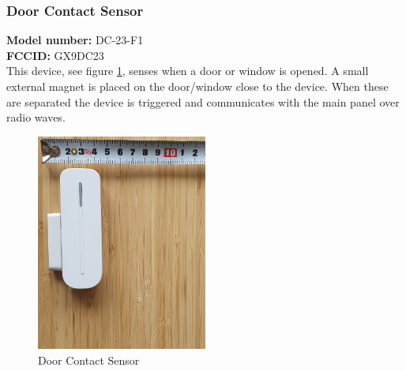 \subsubsection{Door Contact Sensor}
\textbf{Model number:} DC-23-F1 \\
\textbf{FCCID:} GX9DC23 \\
This device, see figure \ref{fig:door-contact}, senses when a door or window is opened. A small external magnet is placed on the door/window close to the device. When these are separated the device is triggered and communicates with the main panel over radio waves.
\begin{figure}[!ht]
  \begin{center}
    \includegraphics[width=0.5\textwidth]{images/door-contact.png}
  \end{center}
  \caption{Door Contact Sensor}
  \label{fig:door-contact}
\end{figure}

